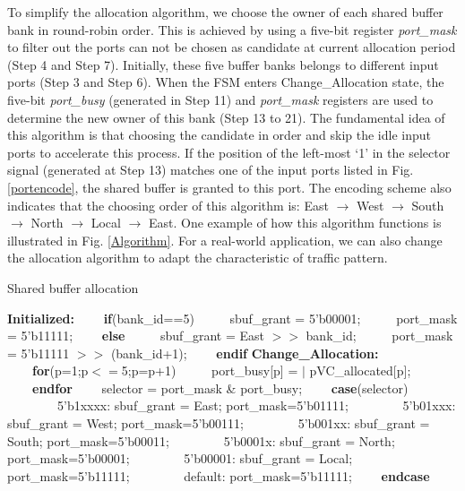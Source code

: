 \documentclass[paper]{ieice}
\begin{document}
To simplify the allocation algorithm, we choose the owner of each shared buffer bank in round-robin order. This is achieved by using a five-bit register \emph{port\_mask} to filter out the ports can not be chosen as candidate at current allocation period (Step 4 and Step 7). Initially, these five buffer banks belongs to different input ports (Step 3 and Step 6). When the FSM enters Change\_Allocation state, the five-bit \emph{port\_busy} (generated in Step 11) and \emph{port\_mask} registers are used to determine the new owner of this bank (Step 13 to 21). The fundamental idea of this algorithm is that choosing the candidate in order and skip the idle input ports to accelerate this process. If the position of the left-most `1' in the selector signal (generated at Step 13) matches one of the input ports listed in Fig. \ref{portencode}, the shared buffer is granted to this port. The encoding scheme also indicates that the choosing order of this algorithm is: East $\to$ West $\to$ South $\to$ North $\to$ Local $\to$ East. One example of how this algorithm functions is illustrated in Fig. \ref{Algorithm}. For a real-world application, we can also change the allocation algorithm to adapt the characteristic of traffic pattern.
\begin{algorithm}[h]
\caption{Shared buffer allocation}\label{alg:bufferalloc}
\begin{algorithmic}[1]
\STATE \textbf{Initialized:}
\STATE \ \ \ \ \textbf{if}(bank\_id==5)
\STATE \ \ \ \ \ sbuf\_grant = 5'b00001;
\STATE \ \ \ \ \ port\_mask = 5'b11111;
\STATE \ \ \ \ \textbf{else}
\STATE \ \ \ \ \ sbuf\_grant = East $>>$ bank\_id;
\STATE \ \ \ \ \ port\_mask = 5'b11111 $>>$ (bank\_id+1);
\STATE \ \ \ \ \textbf{endif}
\STATE \textbf{Change\_Allocation:}
\STATE \ \ \ \ \textbf{for}(p=1;p$<=$5;p=p+1)
\STATE \ \ \ \ \ port\_busy[p] = $|$ pVC\_allocated[p];
\STATE \ \ \ \ \textbf{endfor}
\STATE \ \ \ \ selector = port\_mask \& port\_busy;
\STATE \ \ \ \ \textbf{case}(selector)
\STATE \ \ \ \ \ \ \ \ 5'b1xxxx: sbuf\_grant = East; port\_mask=5'b01111;
\STATE \ \ \ \ \ \ \ \ 5'b01xxx: sbuf\_grant = West; port\_mask=5'b00111;
\STATE \ \ \ \ \ \ \ \ 5'b001xx: sbuf\_grant = South; port\_mask=5'b00011;
\STATE \ \ \ \ \ \ \ \ 5'b0001x: sbuf\_grant = North; port\_mask=5'b00001;
\STATE \ \ \ \ \ \ \ \ 5'b00001: sbuf\_grant = Local; port\_mask=5'b11111;
\STATE \ \ \ \ \ \ \ \ default: port\_mask=5'b11111;
\STATE \ \ \ \ \textbf{endcase}
\end{algorithmic}
\end{algorithm}
\end{document}

